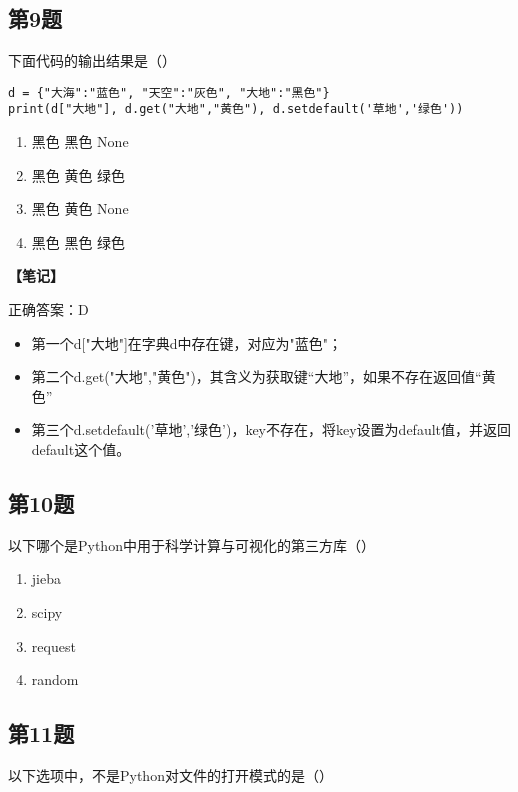 \subsection{第9题}
下面代码的输出结果是（）
\begin{lstlisting}
d = {"大海":"蓝色", "天空":"灰色", "大地":"黑色"}
print(d["大地"], d.get("大地","黄色"), d.setdefault('草地','绿色'))
\end{lstlisting}

\begin{enumerate}[label=\Alph*.]
  \item 黑色 黑色 None
  \item 黑色 黄色 绿色
  \item 黑色 黄色 None
  \item 黑色 黑色 绿色
\end{enumerate}

\begin{mdframed}[linewidth=1pt, linecolor=black]

  \textbf{\color{red}【笔记】}

  正确答案：D

  \begin{itemize}
    \item 第一个d["大地"]在字典d中存在键，对应为"蓝色"；
    \item 第二个d.get("大地","黄色")，其含义为获取键“大地”，如果不存在返回值“黄色”
    \item 第三个d.setdefault('草地','绿色')，key不存在，将key设置为default值，并返回default这个值。
  \end{itemize}

\end{mdframed}

\subsection{第10题}
以下哪个是Python中用于科学计算与可视化的第三方库（）

\begin{enumerate}[label=\Alph*.]
  \item jieba
  \item scipy
  \item request
  \item random
\end{enumerate}

\subsection{第11题}
以下选项中，不是Python对文件的打开模式的是（）

